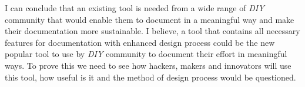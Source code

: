 I can conclude that an existing tool is needed from a wide range of \textit{DIY} community that would enable them to document in a meaningful way and make their documentation more sustainable. I believe, a tool that contains all necessary features for documentation with enhanced design process could be the new popular tool to use by \textit{DIY} community to document their effort in meaningful ways. To prove this we need to see how hackers, makers and innovators will use this tool, how useful is it and the method of design process would be questioned.

